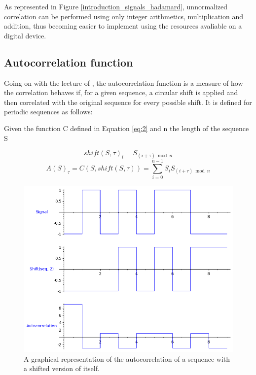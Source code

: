 As represented in Figure \ref{introduction_signals_hadamard}, unnormalized
correlation can be performed using only integer arithmetics, multiplication
and addition, thus becoming easier to implement using the resources  avaliable
on a digital device.










\subsection{Autocorrelation function}

Going on with the lecture of \citet{golomb_ref}, the autocorrelation function
is a measure of how the correlation behaves if, for a given sequence, a
circular shift is applied and then correlated with the original sequence for every
possible shift. It is defined for periodic sequences as follows:

\begin{definition}[Autocorrelation]\label{def:3}

Given the function C defined in Equation \eqref{eq:2} and n the length of the
sequence S

\begin{equation}\label{eq:3}
  shift(S, \tau)_i = S_{(i+\tau) \bmod n}
\end{equation}
\begin{equation}\label{eq:4}
  A(S)_{\tau} = C(S, shift(S, \tau)) = \sum_{i=0}^{n-1}S_{i}S_{(i+\tau) \bmod n}
\end{equation}

\end{definition}

\begin{figure}[ht!] %
\begin{center}
\includegraphics[width=0.7\linewidth]{Chapters/Introduction/signals_autocorrelation}
\end{center}
\caption{A graphical representation of the autocorrelation of a sequence with  a shifted version of itself.}
\label{introduction_signals_autocorrelation}
\end{figure}

